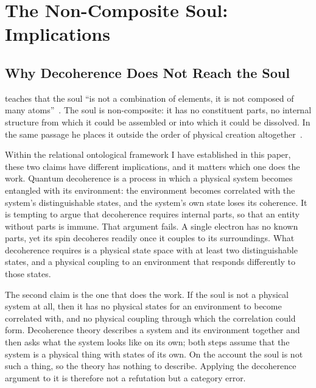 
\section{The Non-Composite Soul: Implications}
\label{sec:soul}


\subsection{Why Decoherence Does Not Reach the Soul}

\AbdulBaha teaches that the soul ``is not a combination of elements,
it is not composed of many atoms''~\citep[p.~91]{ParisTalks}.
The soul is non-composite: it has no constituent parts, no internal structure
from which it could be assembled or into which it could be dissolved.
In the same passage he places it outside the order of physical creation
altogether~\citep[p.~91]{ParisTalks}.

Within the relational ontological framework I have established in this paper,
these two claims have different implications, and it matters which one does
the work.
Quantum decoherence is a process in which a physical system becomes entangled
with its environment: the environment becomes correlated with the system's
distinguishable states, and the system's own state loses its coherence.
It is tempting to argue that decoherence requires internal parts, so that an
entity without parts is immune.
That argument fails.
A single electron has no known parts, yet its spin decoheres readily once it
couples to its surroundings.
What decoherence requires is a physical state space with at least two
distinguishable states, and a physical coupling to an environment that
responds differently to those states.

The second claim is the one that does the work.
If the soul is not a physical system at all, then it has no physical states
for an environment to become correlated with, and no physical coupling through
which the correlation could form.
Decoherence theory describes a system and its environment together and then
asks what the system looks like on its own; both steps assume that the system
is a physical thing with states of its own.
On the \bahai account the soul is not such a thing, so the theory has nothing
to describe.
Applying the decoherence argument to it is therefore not a refutation but a
category error.

